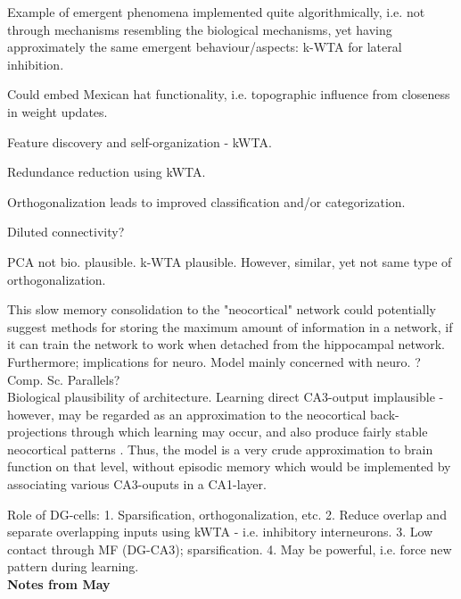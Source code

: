 Example of emergent phenomena implemented quite algorithmically, i.e. not through mechanisms resembling the biological mechanisms, yet having approximately the same emergent behaviour/aspects: k-WTA for lateral inhibition.

Could embed Mexican hat functionality, i.e. topographic influence from closeness in weight updates.

Feature discovery and self-organization - kWTA.

Redundance reduction using kWTA.

Orthogonalization leads to improved classification and/or categorization.

Diluted connectivity?

PCA not bio. plausible. k-WTA plausible. However, similar, yet not same type of orthogonalization.

This slow memory consolidation to the "neocortical" network could potentially suggest methods for storing the maximum amount of information in a network, if it can train the network to work when detached from the hippocampal network.
\\
Furthermore; implications for neuro. Model mainly concerned with neuro. ? Comp. Sc. Parallels?
\\

Biological plausibility of \citep{McClelland1995} architecture. Learning direct CA3-output implausible - however, may be regarded as an approximation to the neocortical back-projections through which learning may occur, and also produce fairly stable neocortical patterns \citep{Rolls1998chpt6}. Thus, the model is a very crude approximation to brain function on that level, without episodic memory which would be implemented by associating various CA3-ouputs in a CA1-layer.

Role of DG-cells: 
1. Sparsification, orthogonalization, etc.
2. Reduce overlap and separate overlapping inputs using kWTA - i.e. inhibitory interneurons.
3. Low contact through MF (DG-CA3); sparsification.
4. May be powerful, i.e. force new pattern during learning.
\citep{Rolls1998chpt6}
\\

\textbf{Notes from May}

